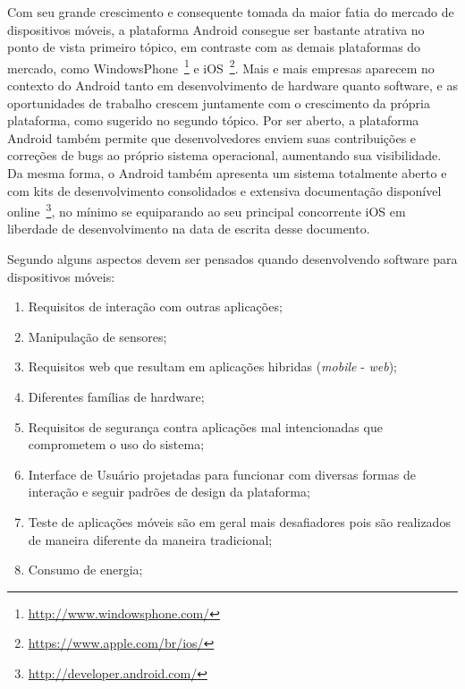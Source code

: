 Com seu grande crescimento e consequente tomada da maior fatia do mercado de dispositivos móveis, a plataforma Android consegue ser bastante atrativa no ponto de vista primeiro tópico, em contraste com as demais plataformas do mercado, como WindowsPhone~\footnote{\url{http://www.windowsphone.com/}} e iOS~\footnote{\url{https://www.apple.com/br/ios/}}. Mais e mais empresas aparecem no contexto do Android tanto em desenvolvimento de hardware quanto software, e as oportunidades de trabalho crescem juntamente com o crescimento da própria plataforma, como sugerido no segundo tópico. Por ser aberto, a plataforma Android também permite que desenvolvedores enviem suas contribuições e correções de bugs ao próprio sistema operacional, aumentando sua visibilidade. Da mesma forma, o Android também apresenta um sistema totalmente aberto e com kits de desenvolvimento consolidados e extensiva documentação disponível online~\footnote{\url{http://developer.android.com/}}, no mínimo se equiparando ao seu principal concorrente iOS em liberdade de desenvolvimento na data de escrita desse documento.

Segundo  alguns aspectos devem ser pensados quando desenvolvendo software para dispositivos móveis:

\begin{enumerate}
\item Requisitos de interação com outras aplicações;
\item Manipulação de sensores;
\item Requisitos web que resultam em aplicações hibridas (\textit{mobile} - \textit{web});
\item Diferentes famílias de hardware;
\item Requisitos de segurança contra aplicações mal intencionadas que comprometem o uso do sistema;
\item Interface de Usuário projetadas para funcionar com diversas formas de interação e seguir padrões de design da plataforma;
\item Teste de aplicações móveis são em geral mais desafiadores pois são realizados de maneira diferente da maneira tradicional;
\item Consumo de energia;
\end{enumerate}

